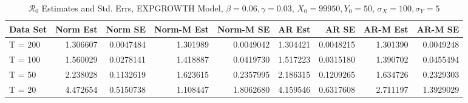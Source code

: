 \documentclass[12pt]{article}
\newcommand{\rr}{\ensuremath{\mathcal{R}_0}}
\begin{document}
\begin{table}
	
	\caption{\label{tab:}$\rr$ Estimates and Std. Errs, EXPGROWTH Model,
		$\beta = 0.06, \gamma = 0.03$, $X_0 = 99950, Y_0 = 50$, $\sigma_X = 100, \sigma_Y = 5$}
	\centering
	\begin{tabular}[t]{l|r|r|r|r|r|r|r|r}
		\hline
		Data Set & Norm Est & Norm SE & Norm-M Est & Norm-M SE & AR Est & AR SE & AR-M Est & AR-M SE\\
		\hline
		T = 200 & 1.306607 & 0.0047484 & 1.301989 & 0.0049042 & 1.304421 & 0.0048215 & 1.301390 & 0.0049248\\
		\hline
		T = 100 & 1.560029 & 0.0278141 & 1.418887 & 0.0419730 & 1.517223 & 0.0315180 & 1.390702 & 0.0455494\\
		\hline
		T = 50 & 2.238028 & 0.1132619 & 1.623615 & 0.2357995 & 2.186315 & 0.1209265 & 1.634726 & 0.2329303\\
		\hline
		T = 20 & 4.472654 & 0.5150738 & 1.108447 & 1.8062680 & 4.159546 & 0.6317608 & 2.711197 & 1.3929029\\
		\hline
	\end{tabular}
\end{table}
\end{document}
